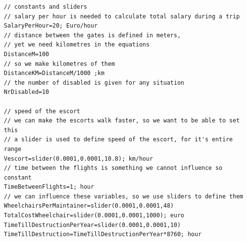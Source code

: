 \documentclass[a4paper, 11pt, notitlepage]{report}
\begin{document}
\begin{appendices}
\begin{lstlisting}
// constants and sliders
// salary per hour is needed to calculate total salary during a trip
SalaryPerHour=20; Euro/hour 
// distance between the gates is defined in meters, 
// yet we need kilometres in the equations
DistanceM=100 
// so we make kilometres of them
DistanceKM=DistanceM/1000 ;km
// the number of disabled is given for any situation
NrDisabled=10 

// speed of the escort
// we can make the escorts walk faster, so we want to be able to set this
// a slider is used to define speed of the escort, for it's entire range
Vescort=slider(0.0001,0.0001,10.8); km/hour 
// time between the flights is something we cannot influence so constant
TimeBetweenFlights=1; hour 
// we can influence these variables, so we use sliders to define them
WheelchairsPerMaintainer=slider(0.0001,0.0001,48) 
TotalCostWheelchair=slider(0.0001,0.0001,1000); euro 
TimeTillDestructionPerYear=slider(0.0001,0.0001,10)
TimeTillDestruction=TimeTillDestructionPerYear*8760; hour
\end{lstlisting}

\end{appendices}







\end{document}
